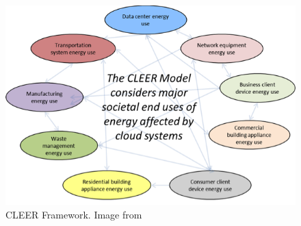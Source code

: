 \begin{figure} [!h]
\centering
\includegraphics[scale=.5]{methodology/images/cleer_diagram.png}
\caption[CLEER Framework]{CLEER Framework.  Image from \cite{CLEER13}}
\label{img_cleer}
\end{figure}